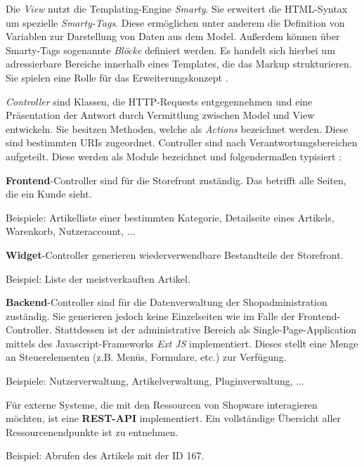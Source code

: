 \documentclass[11pt, a4paper, titlepage, listof=totoc, bibliography=totoc, index=totoc, twoside, openright, headings=normal, draft]{scrreprt}
\begin{document}
Die \emph{View} nutzt die Templating-Engine \emph{Smarty}. Sie erweitert die HTML-Syntax um spezielle \emph{Smarty-Tags}. Diese ermöglichen unter anderem die Definition von Variablen zur Darstellung von Daten aus dem Model. Außerdem können über Smarty-Tags sogenannte \emph{Blöcke} definiert werden. Es handelt sich hierbei um adressierbare Bereiche innerhalb eines Templates, die das Markup strukturieren. Sie spielen eine Rolle für das Erweiterungskonzept \citep{shopware5Docs}.

\emph{Controller} sind Klassen, die HTTP-Requests entgegennehmen und eine Präsentation der Antwort durch Vermittlung zwischen Model und View entwickeln. Sie besitzen Methoden, welche als \emph{Actions} bezeichnet werden. Diese sind  bestimmten URIs zugeordnet. Controller sind nach Verantwortungsbereichen aufgeteilt. Diese werden als Module bezeichnet und folgendermaßen typisiert \citep{shopware4Docs}:
\begin{compactitem}
\item \textbf{Frontend}-Controller sind für die Storefront zuständig. Das betrifft alle Seiten, die ein Kunde sieht.\vspace{0.3em}

Beispiele: Artikelliste einer bestimmten Kategorie, Detailseite eines Artikels, Warenkorb, Nutzeraccount, ...
\item \textbf{Widget}-Controller generieren wiederverwendbare Bestandteile der Storefront.\vspace{0.3em}

Beispiel: Liste der meistverkauften Artikel.
\item \textbf{Backend}-Controller sind für die Datenverwaltung der Shopadministration zuständig. Sie generieren jedoch keine Einzelseiten wie im Falle der Frontend-Controller. Stattdessen ist der administrative Bereich als Single-Page-Application mittels des Javascript-Frameworks \emph{Ext JS} implementiert. Dieses stellt eine Menge an Steuerelementen (z.B. Menüs, Formulare, etc.) zur Verfügung.\vspace{0.3em}

Beispiele: Nutzerverwaltung, Artikelverwaltung, Pluginverwaltung, ...
\item Für externe Systeme, die mit den Ressourcen von Shopware interagieren möchten, ist eine \textbf{REST-API} implementiert. Ein vollständige Übersicht aller Ressourcenendpunkte ist \citet{shopwareRestApiEndpunkte} zu entnehmen.\vspace{0.3em}

Beispiel: Abrufen des Artikels mit der ID 167.
\end{compactitem}
\end{document}
